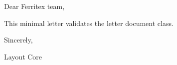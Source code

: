 \documentclass{letter}
\begin{document}
Dear Ferritex team,

This minimal letter validates the letter document class.

Sincerely,

Layout Core
\end{document}
